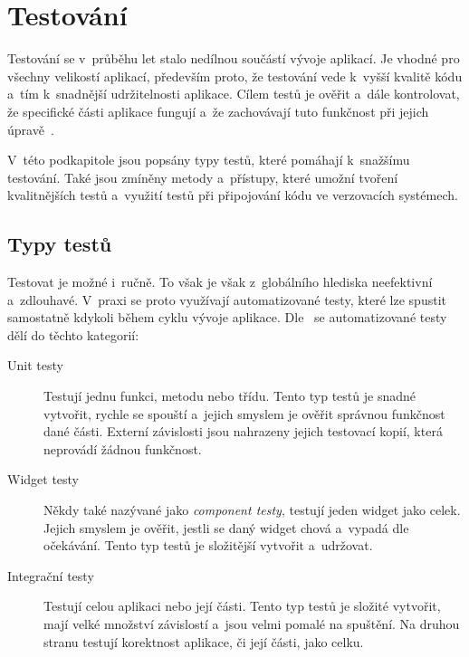 \section{Testování}

Testování se v~průběhu let stalo nedílnou součástí vývoje aplikací.
Je vhodné pro všechny velikostí aplikací,
především proto,
že testování vede k~vyšší kvalitě kódu
a~tím k~snadnější udržitelnosti aplikace.
Cílem testů je ověřit a~dále kontrolovat,
že specifické části aplikace fungují
a~že zachovávají tuto funkčnost při jejich úpravě~\cite{testing_quality}.
\emph{}~\cite[str.~31]{martin_clean_architecture}

V~této podkapitole jsou popsány typy testů,
které pomáhají k~snažšímu testování.
Také jsou zmíněny metody a~přístupy,
které umožní tvoření kvalitnějších testů
a~využití testů při připojování kódu ve verzovacích systémech.

\subsection{Typy testů}

Testovat je možné i~ručně.
To však je však z~globálního hlediska neefektivní a~zdlouhavé.
V~praxi se proto využívají automatizované testy,
které lze spustit samostatně kdykoli během cyklu vývoje
aplikace.
Dle~\cite{testing_flutter} se automatizované testy dělí do těchto kategorií:

\begin{description}
    \item[Unit testy] Testují jednu funkci, metodu nebo třídu.
    Tento typ testů je snadné vytvořit,
    rychle se spouští
    a~jejich smyslem je ověřit správnou funkčnost dané části.
    Externí závislosti jsou nahrazeny jejich testovací kopií,
    která neprovádí žádnou funkčnost.
    \item[Widget testy] Někdy také nazývané jako \emph{component testy},
    testují jeden widget jako celek.
    Jejich smyslem je ověřit,
    jestli se daný widget chová a~vypadá dle očekávání.
    Tento typ testů je složitější vytvořit a~udržovat.
    \item[Integrační testy] Testují celou aplikaci nebo její části.
    Tento typ testů je složité vytvořit,
    mají velké množství závislostí a~jsou velmi pomalé na spuštění.
    Na druhou stranu testují korektnost aplikace,
    či její části,
    jako celku.
\end{description}

